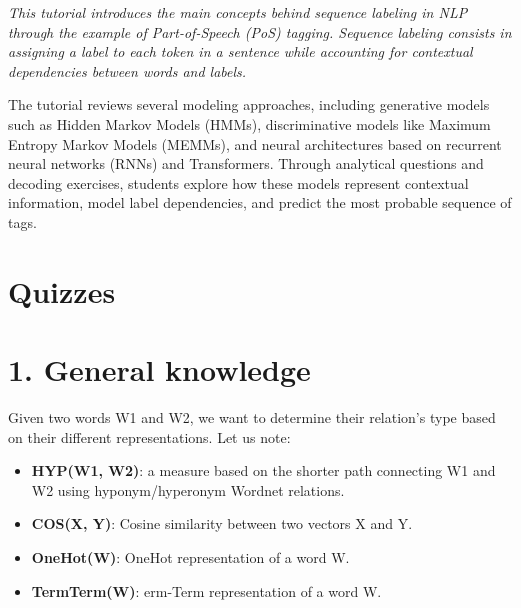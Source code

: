 \documentclass{../extra/aakpract/aakpract}
\begin{document}
	
	\maketitle
	
	\begin{center}
		\begin{minipage}{0.85\textwidth}
			\small\itshape
			This tutorial introduces the main concepts behind sequence labeling in NLP through the example of Part-of-Speech (PoS) tagging. 
			Sequence labeling consists in assigning a label to each token in a sentence while accounting for contextual dependencies between words and labels.
			
			\vspace{6pt}
			The tutorial reviews several modeling approaches, including generative models such as Hidden Markov Models (HMMs), discriminative models like Maximum Entropy Markov Models (MEMMs), and neural architectures based on recurrent neural networks (RNNs) and Transformers. 
			Through analytical questions and decoding exercises, students explore how these models represent contextual information, model label dependencies, and predict the most probable sequence of tags.
			
		\end{minipage}
	\end{center}

	\section{Quizzes}
	
	

\section*{1. General knowledge}

Given two words W1 and W2, we want to determine their relation's type based on their different representations.
Let us note:
\begin{itemize}
	\item \textbf{HYP(W1, W2)}: a measure based on the shorter path connecting W1 and W2 using hyponym/hyperonym Wordnet relations.
	\item \textbf{COS(X, Y)}: Cosine similarity between two vectors X and Y.
	\item \textbf{OneHot(W)}: OneHot representation of a word W.
	\item \textbf{TermTerm(W)}: erm-Term representation of a word W.
\end{itemize}
\end{document}
